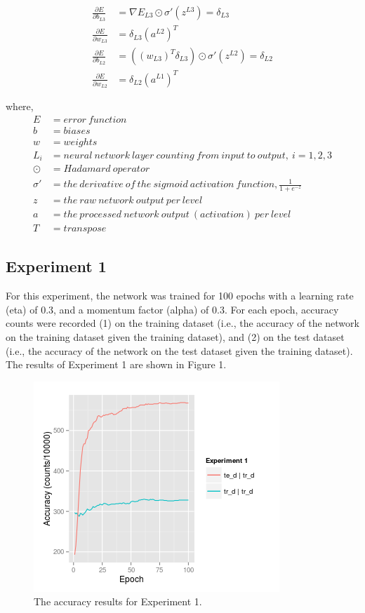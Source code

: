 \documentclass[12pt]{article}
\begin{document}
\begin{align}
\frac{\partial E}{\partial b_{L3}} &= \nabla E_{L3} \odot \sigma'(z^{L3}) = \delta_{L3}\\
\frac{\partial E}{\partial w_{L3}} &= \delta_{L3}(a^{L2})^{T}\\
\frac{\partial E}{\partial b_{L2}} &= ((w_{L3})^T \delta_{L3}) \odot \sigma'(z^{L2}) = \delta_{L2}\\
\frac{\partial E}{\partial w_{L2}} &= \delta_{L2}(a^{L1})^{T}
\end{align}

where,
\begin{align*}
E &=  error \ function\\
b &= biases\\
w &= weights\\
L_i &= neural \ network \ layer \ counting \ from \ input \ to \ output, \ i = 1,2,3 \\
\odot  &= Hadamard \ operator\\
\sigma' &= the \ derivative \ of \ the \ sigmoid \ activation \ function, \frac{1}{1+e^{-z}}\\
z &= the \ raw \ network \ output \ per \ level\\
a &= the \ processed \ network \ output \ (activation) \ per \ level\\
T &= transpose
\end{align*}

\subsection{Experiment 1}
For this experiment, the network was trained for 100 epochs with a learning rate (eta) of 0.3, and a momentum factor (alpha) of 0.3. For each epoch, accuracy counts were recorded (1) on the training dataset (i.e., the accuracy of the network on the training dataset given the training dataset), and (2) on the test dataset (i.e., the accuracy of the network on the test dataset given the training dataset). The results of Experiment 1 are shown in Figure 1. 
\begin{figure}
  \begin{center}
    \includegraphics{Rplot1.png}
    \caption{The accuracy results for Experiment 1.}
  \end{center}
\end{figure}
\end{document}

